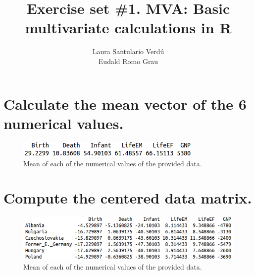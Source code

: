\documentclass[10pt, a4paper, oneside]{article}
\title{Exercise set \#1. MVA: Basic multivariate calculations in R}
\author{Laura Santulario Verdú  \\ Eudald Romo Grau}
\begin{document}
\maketitle

\pagebreak

\section{Calculate the mean vector of the 6 numerical values.}

\vspace{5mm}
\begin{figure}[h!]\centering\includegraphics[scale=0.6]{pov_mean.png}\caption{Mean of each of the numerical values of the provided data.}\label{mean}\end{figure}
\vspace{5mm}

\section{Compute the centered data matrix.}

\vspace{5mm}
\begin{figure}[h!]\centering\includegraphics[scale=0.6]{pov_centered.png}\caption{Mean of each of the numerical values of the provided data.}\label{mean}\end{figure}
\vspace{5mm}
\end{document}
